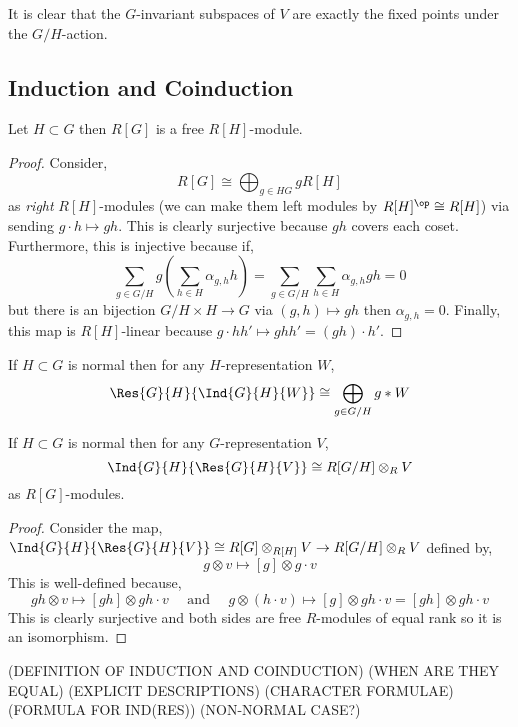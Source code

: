 \documentclass[12pt]{article}
\begin{document}
\begin{rmk}
It is clear that the $G$-invariant subspaces of $V$ are exactly the fixed points under the $G/H$-action.
\end{rmk}

\subsection{Induction and Coinduction}

\begin{prop}
Let $H \subset G$ then $R[G]$ is a free $R[H]$-module.
\end{prop}

\begin{proof}
Consider, 
\[ R[G] \cong \bigoplus_{g \in H  G} g R[H] \]
as \textit{right} $R[H]$-modules (we can make them left modules by $R[H]^\op \cong R[H]$) via sending $g \cdot h \mapsto gh$. This is clearly surjective because $gh$ covers each coset. Furthermore, this is injective because if,
\[ \sum_{g \in G/H} g \left( \sum_{h \in H} \alpha_{g,h} h \right) = \sum_{g \in G / H} \sum_{h \in H} \alpha_{g,h} gh = 0 \]
but there is an bijection $G / H \times H \to G$ via $(g,h) \mapsto gh$ then $\alpha_{g,h} = 0$. Finally, this map is $R[H]$-linear because $g \cdot h h' \mapsto gh h' = (gh) \cdot h'$.
\end{proof}

\begin{prop}
If $H \subset G$ is normal then for any $H$-representation $W$,
\[ \Res{G}{H}{\Ind{G}{H}{W}} \cong \bigoplus_{g \in G / H} g * W \]
\end{prop}

\begin{prop}
If $H \subset G$ is normal then for any $G$-representation $V$,
\[ \Ind{G}{H}{\Res{G}{H}{V}} \cong R[G/H] \otimes_R V \]
as $R[G]$-modules.
\end{prop}

\begin{proof}
Consider the map, $\Ind{G}{H}{\Res{G}{H}{V}} \cong R[G] \otimes_{R[H]} V \to R[G/H] \otimes_R V$ defined by,
\[ g \otimes v \mapsto [g] \otimes g \cdot v \]
This is well-defined because,
\[ gh \otimes v \mapsto [gh] \otimes gh \cdot v \quad \text{ and } \quad g \otimes (h \cdot v) \mapsto [g] \otimes g h \cdot v = [gh] \otimes gh \cdot v \]
This is clearly surjective and both sides are free $R$-modules of equal rank so it is an isomorphism.
\end{proof}

(DEFINITION OF INDUCTION AND COINDUCTION)
(WHEN ARE THEY EQUAL)
(EXPLICIT DESCRIPTIONS)
(CHARACTER FORMULAE)
(FORMULA FOR IND(RES))
(NON-NORMAL CASE?)
\end{document}
